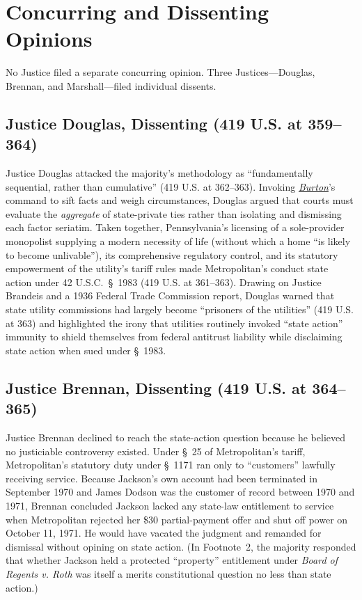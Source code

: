 \documentclass[12pt]{article}
\begin{document}
\section{Concurring and Dissenting Opinions}

No Justice filed a separate concurring opinion. Three Justices---Douglas, Brennan, and Marshall---filed individual dissents.

\subsection{Justice Douglas, Dissenting (419 U.S. at 359--364)}
Justice Douglas attacked the majority's methodology as ``fundamentally sequential, rather than cumulative'' (419 U.S. at 362--363). Invoking \href{https://supreme.justia.com/cases/federal/us/365/715/}{\emph{Burton}}'s command to sift facts and weigh circumstances, Douglas argued that courts must evaluate the \emph{aggregate} of state-private ties rather than isolating and dismissing each factor seriatim. Taken together, Pennsylvania's licensing of a sole-provider monopolist supplying a modern necessity of life (without which a home ``is likely to become unlivable''), its comprehensive regulatory control, and its statutory empowerment of the utility's tariff rules made Metropolitan's conduct state action under 42 U.S.C.\ \S~1983 (419 U.S. at 361--363). Drawing on Justice Brandeis and a 1936 Federal Trade Commission report, Douglas warned that state utility commissions had largely become ``prisoners of the utilities'' (419 U.S. at 363) and highlighted the irony that utilities routinely invoked ``state action'' immunity to shield themselves from federal antitrust liability while disclaiming state action when sued under \S~1983.

\subsection{Justice Brennan, Dissenting (419 U.S. at 364--365)}
Justice Brennan declined to reach the state-action question because he believed no justiciable controversy existed. Under \S~25 of Metropolitan's tariff, Metropolitan's statutory duty under \S~1171 ran only to ``customers'' lawfully receiving service. Because Jackson's own account had been terminated in September 1970 and James Dodson was the customer of record between 1970 and 1971, Brennan concluded Jackson lacked any state-law entitlement to service when Metropolitan rejected her \$30 partial-payment offer and shut off power on October 11, 1971. He would have vacated the judgment and remanded for dismissal without opining on state action. (In Footnote~2, the majority responded that whether Jackson held a protected ``property'' entitlement under \emph{Board of Regents v. Roth} was itself a merits constitutional question no less than state action.)
\end{document}
